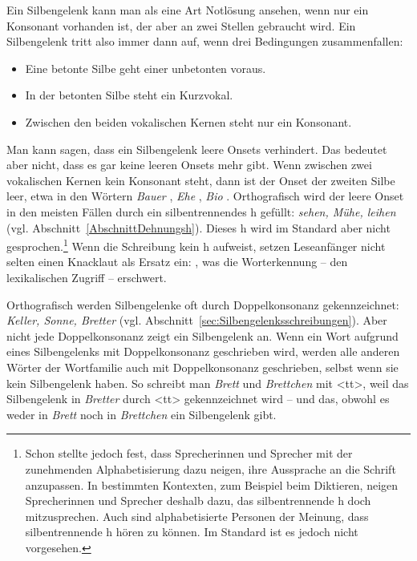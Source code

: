 Ein Silbengelenk kann man als eine Art Notlösung ansehen, wenn nur ein Konsonant vorhanden ist, der aber an zwei Stellen gebraucht wird. Ein Silbengelenk tritt also immer dann auf, wenn drei Bedingungen zusammenfallen:
\begin{itemize}
    \item Eine betonte Silbe geht einer unbetonten voraus.
    \item In der betonten Silbe steht ein Kurzvokal.
    \item Zwischen den beiden vokalischen Kernen steht nur ein Konsonant.
\end{itemize}

Man kann sagen, dass ein Silbengelenk leere Onsets verhindert. Das bedeutet aber nicht, dass es gar keine leeren Onsets mehr gibt. Wenn zwischen zwei vokalischen Kernen kein Konsonant steht, dann ist der Onset der zweiten Silbe leer, etwa in den Wörtern \textit{Bauer} , \textit{Ehe} \textipa{[\textprimstress Pe:.@]}, \textit{Bio} \textipa{[\textprimstress bi:.o]}. Orthografisch wird der leere Onset in den meisten Fällen durch ein silbentrennendes h gefüllt: \textit{sehen, Mühe, leihen} (vgl. Abschnitt~\ref{AbschnittDehnungsh}). Dieses h wird im Standard aber nicht gesprochen.\footnote{Schon \citet{Levitt1978} stellte jedoch fest, dass Sprecherinnen und Sprecher mit der zunehmenden Alphabetisierung dazu neigen, ihre Aussprache an die Schrift anzupassen. In bestimmten Kontexten, zum Beispiel beim Diktieren, neigen Sprecherinnen und Sprecher deshalb dazu, das silbentrennende h doch mitzusprechen. Auch sind alphabetisierte Personen der Meinung, dass silbentrennende h hören zu können. Im Standard ist es jedoch nicht vorgesehen.} Wenn die Schreibung kein h aufweist, setzen Leseanfänger nicht selten einen Knacklaut als Ersatz ein: \textipa{[\textprimstress bi:.Po]}, was die Worterkennung -- den lexikalischen Zugriff -- erschwert.

Orthografisch werden Silbengelenke oft durch Doppelkonsonanz gekennzeichnet: \textit{Keller, Sonne, Bretter} (vgl. Abschnitt~\ref{sec:Silbengelenksschreibungen}). Aber nicht jede Doppelkonsonanz zeigt ein Silbengelenk an. Wenn ein Wort aufgrund eines Silbengelenks mit Doppelkonsonanz geschrieben wird, werden alle anderen Wörter der Wortfamilie auch mit Doppelkonsonanz geschrieben, selbst wenn sie kein Silbengelenk haben. So schreibt man \textit{Brett} und \textit{Brettchen} mit <tt>, weil das Silbengelenk in \textit{Bretter} durch <tt> gekennzeichnet wird -- und das, obwohl es weder in \textit{Brett} noch in \textit{Brettchen} ein Silbengelenk gibt.

